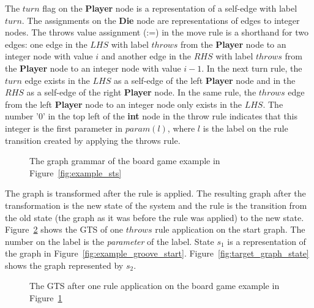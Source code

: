 The $turn$ flag on the \textbf{Player} node is a representation of a self-edge with label $turn$. The assignments on the \textbf{Die} node are representations of edges to integer nodes. The throws value assignment (:=) in the move rule is a shorthand for two edges: one edge in the $\mathit{LHS}$ with label $throws$ from the \textbf{Player} node to an integer node with value $i$ and another edge in the $\mathit{RHS}$ with label $throws$ from the \textbf{Player} node to an integer node with value $i-1$. In the next turn rule, the $turn$ edge exists in the $\mathit{LHS}$ as a self-edge of the left \textbf{Player} node and in the $\mathit{RHS}$ as a self-edge of the right \textbf{Player} node. In the same rule, the $throws$ edge from the left \textbf{Player} node to an integer node only exists in the $\mathit{LHS}$. The number '0' in the top left of the \textbf{int} node in the throw rule indicates that this integer is the first parameter in $param(l)$, where $l$ is the label on the rule transition created by applying the throws rule.

\begin{figure}[ht]
  \begin{center}
    \quad
  \end{center}
  \caption{The graph grammar of the board game example in Figure~\ref{fig:example_sts}}
  \label{fig:example_groove}
\end{figure}

The graph is transformed after the rule is applied. The resulting graph after the transformation is the new state of the system and the rule is the transition from the old state (the graph as it was before the rule was applied) to the new state. Figure~\ref{fig:gts_example} shows the GTS of one $throws$ rule application on the start graph. The number on the label is the \textit{parameter} of the label. State $s_1$ is a representation of the graph in Figure~\ref{fig:example_groove_start}. Figure~\ref{fig:target_graph_state} shows the graph represented by $s_2$.

\begin{figure}[ht]
  \begin{center}
    
  \end{center}
  \caption{The GTS after one rule application on the board game example in Figure~\ref{fig:example_groove}}
  \label{fig:gts_example}
\end{figure}

